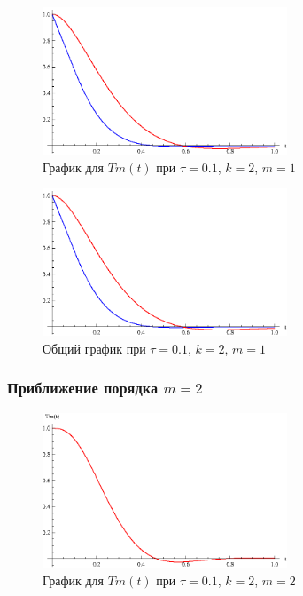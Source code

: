 \begin{figure}[h]
\begin{center}
\includegraphics[width=0.65\textwidth]{./3_results/2_2.eps}
\end{center}
\caption{График для $Tm(t)$ при $\tau=0.1$, $k=2$, $m=1$}
\end{figure}

\begin{figure}[h]
\begin{center}
\includegraphics[width=0.65\textwidth]{./3_results/2_3.eps}
\end{center}
\caption{Общий график при $\tau=0.1$, $k=2$, $m=1$}
\end{figure}

\newpage

\subsubsection{Приближение порядка $m=2$}

\begin{figure}[h]
\begin{center}
\includegraphics[width=0.65\textwidth]{./3_results/2_4.eps}
\end{center}
\caption{График для $Tm(t)$ при $\tau=0.1$, $k=2$, $m=2$}
\end{figure}

